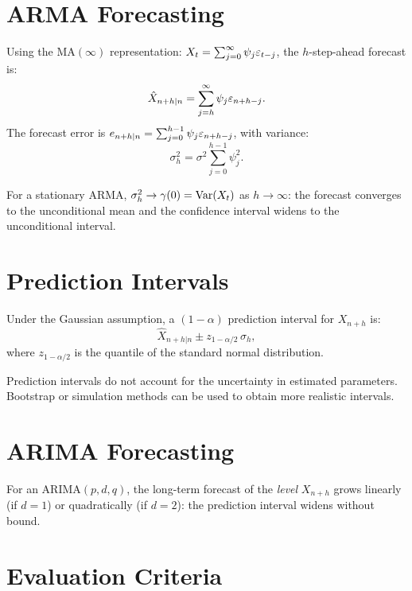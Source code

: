 \section{ARMA Forecasting}

\begin{theorem}
Using the MA$(\infty)$ representation: $X_t=\sum_{j=0}^{\infty}\psi_j\varepsilon_{t-j}$, the $h$-step-ahead forecast is:
\[
\hat{X}_{n+h|n} = \sum_{j=h}^{\infty}\psi_j\varepsilon_{n+h-j}.
\]
The forecast error is $e_{n+h|n}=\sum_{j=0}^{h-1}\psi_j\varepsilon_{n+h-j}$, with variance:
\[
\sigma_h^2 = \sigma^2\sum_{j=0}^{h-1}\psi_j^2.
\]
\end{theorem}

\begin{corollary}
For a stationary ARMA, $\sigma_h^2\to\gamma(0)=\operatorname{Var}(X_t)$ as $h\to\infty$: the forecast converges to the unconditional mean and the confidence interval widens to the unconditional interval.
\end{corollary}

\section{Prediction Intervals}

\begin{definition}
Under the Gaussian assumption, a $(1-\alpha)$ prediction interval for $X_{n+h}$ is:
\[
\hat{X}_{n+h|n} \pm z_{1-\alpha/2}\,\sigma_h,
\]
where $z_{1-\alpha/2}$ is the quantile of the standard normal distribution.
\end{definition}

\begin{warning}
Prediction intervals do not account for the uncertainty in estimated parameters. Bootstrap or simulation methods can be used to obtain more realistic intervals.
\end{warning}

\section{ARIMA Forecasting}

\begin{theorem}
For an ARIMA$(p,d,q)$, the long-term forecast of the \emph{level} $X_{n+h}$ grows linearly (if $d=1$) or quadratically (if $d=2$): the prediction interval widens without bound.
\end{theorem}

\section{Evaluation Criteria}

